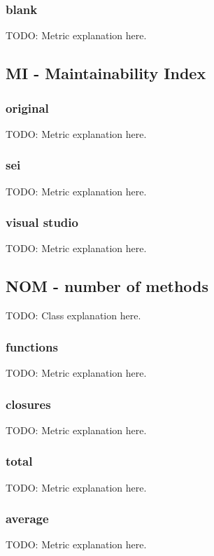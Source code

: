 \subsubsection{blank}
TODO: Metric explanation here.

\subsection{MI - Maintainability Index}

\subsubsection{original}
TODO: Metric explanation here.

\subsubsection{sei}
TODO: Metric explanation here.

\subsubsection{visual studio}
TODO: Metric explanation here.

\subsection{NOM - number of methods}

TODO: Class explanation here.

\subsubsection{functions}
TODO: Metric explanation here.

\subsubsection{closures}
TODO: Metric explanation here.

\subsubsection{total}
TODO: Metric explanation here.

\subsubsection{average}
TODO: Metric explanation here.

